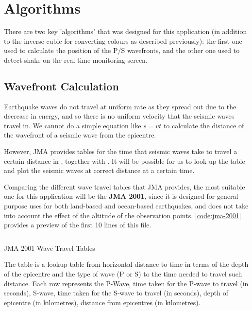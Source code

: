 \section{Algorithms}

There are two key 'algorithms' that was designed for this application (in addition to the inverse-cubic for converting colours as described previously): the first one used to calculate the position of the P/S wavefronts, and the other one used to detect shake on the real-time monitoring screen.

\subsection{Wavefront Calculation}

Earthquake waves do not travel at uniform rate as they spread out due to the decrease in energy, and so there is no uniform velocity that the seismic waves travel in. We cannot do a simple equation like \(s = vt\) to calculate the distance of the wavefront of a seismic wave from the epicentre.

However, JMA provides tables for the time that seismic waves take to travel a certain distance in \autocite{jma-timetable-2001}, together with \autocite{jma-timetable-format}. It will be possible for us to look up the table and plot the seismic waves at correct distance at a certain time.

Comparing the different wave travel tables that JMA provides, the most suitable one for this application will be the \textbf{JMA 2001}, since it is designed for general purpose uses for both land-based and ocean-based earthquakes, and does not take into account the effect of the altitude of the observation points. \autoref{code:jma-2001} provides a preview of the first 10 lines of this file.

\begin{listing}[htp]
    \inputminted[lastline=10,showspaces]{text}{code/tjma2001.txt}
    \caption{JMA 2001 Wave Travel Tables}
    \label{code:jma-2001}
\end{listing}

The table is a lookup table from horizontal distance to time in terms of the depth of the epicentre and the type of wave (P or S) to the time needed to travel such distance. Each row represents the P-Wave, time taken for the P-wave to travel (in seconds), S-wave, time taken for the S-wave to travel (in seconds), depth of epicentre (in kilometres), distance from epicentres (in kilometres).

